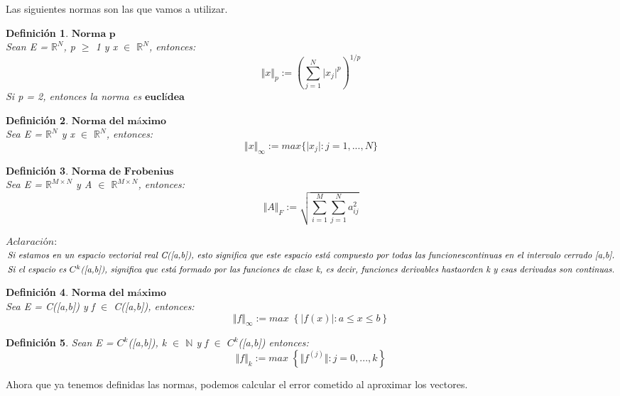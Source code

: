 \documentclass[10pt, a4paper]{article}
\theoremstyle{theorem-style}
\theoremstyle{definition-style}
\newtheorem{ndef}{Definición}[section]
\theoremstyle{remark-style}
\theoremstyle{example-style}
\theoremstyle{definition-style}
\theoremstyle{remark-style}
\begin{document}
Las siguientes normas son las que vamos a utilizar.

\begin{ndef}
$\textbf{Norma p}$\\
Sean E = $\mathbb{R}^N$, p $\geq$ 1 y x $\in$ $\mathbb{R}^N$, entonces:
\[ \Vert x \Vert _{p} := \left( \sum_{j=1}^{N} \vert x_{j} \vert ^p \right) ^{1/p} \]
Si p = 2, entonces la norma es $\textbf{euclídea}$
\end{ndef}

\begin{ndef}
$\textbf{Norma del máximo}$\\
Sea E = $\mathbb{R}^N$ y x $\in$ $\mathbb{R}^N$, entonces:
\[ \Vert x \Vert _{\infty} := max \lbrace \vert x_{j} \vert : j = 1,...,N \rbrace \]
\end{ndef}

\begin{ndef}
$\textbf{Norma de Frobenius}$\\
Sea E = $\mathbb{R}^{M \times N}$ y A $\in$ $\mathbb{R}^{M \times N}$, entonces:
\[ \Vert A \Vert _F := \sqrt{\sum_{i=1}^{M} \sum_{j=1}^{N} a_{ij}^2} \]
\end{ndef}

$\textit{Aclaración:}$\\
$\textit{Si estamos en un espacio vectorial real C([a,b]), esto significa que este espacio está compuesto por todas las funciones}\\
\textit{continuas en el intervalo cerrado [a,b].}$\\
$\textit{Si el espacio es $C^k$([a,b]), significa que está formado por las funciones de clase k, es decir, funciones derivables hasta}\\
\textit{orden k y esas derivadas son continuas.}$

\begin{ndef}
$\textbf{Norma del máximo}$\\
Sea E = C([a,b]) y f $\in$ C([a,b]), entonces:
\[ \Vert f \Vert _\infty := max \; \left\lbrace \vert f(x) \vert : a \leq x \leq b \right\rbrace \]
\end{ndef}

\begin{ndef}
Sean E = $C^k$([a,b]), k $\in$ $\mathbb{N}$ y f $\in$ $C^k$([a,b]) entonces:
\[ \Vert f \Vert _k := max \; \left\lbrace \Vert f^{(j)} \Vert : j = 0,...,k \right\rbrace \]
\end{ndef}

Ahora que ya tenemos definidas las normas, podemos calcular el error cometido al aproximar los vectores.
\end{document}
